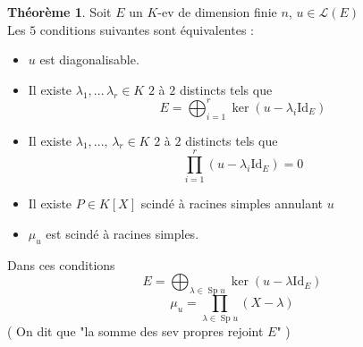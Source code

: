 \documentclass[10pt,a4paper]{article}
\theoremstyle{definition}
\newtheorem{theorem}[proposition]{Théorème}
\DeclareMathOperator{\Sp}{Sp}
\begin{document}
\pagebreak

\begin{theorem}
Soit $E$ un $K$-ev de dimension finie $n$, $u \in \mathcal{L}(E)$ \\
Les $5$ conditions suivantes sont équivalentes :
\begin{itemize}
\item $u$ est diagonalisable.
\item Il existe $\lambda_1, ...\, \lambda_r \in K$ $2$ à $2$ distincts tels que
\[ E = \bigoplus_{i = 1}^r \ker \left( u - \lambda_i \text{Id}_E \right) \]
\item Il existe $\lambda_1, ...,\, \lambda_r \in K$ $2$ à $2$ distincts tels que
\[ \prod_{i = 1}^r \left( u - \lambda_i \text{Id}_E \right) = 0 \]
\item Il existe $P \in K[X]$ scindé à racines simples annulant $u$
\item $\mu_u$ est scindé à racines simples.
\end{itemize}
Dans ces conditions
\[ \boxed{E = \bigoplus_{\lambda \in \Sp u} \ker \left( u - \lambda \text{Id}_E \right)} \]
\[ \boxed{\mu_u = \prod_{\lambda \in \Sp u} (X - \lambda)} \]
( On dit que "la somme des sev propres rejoint $E$" )
\end{theorem}
\end{document}
